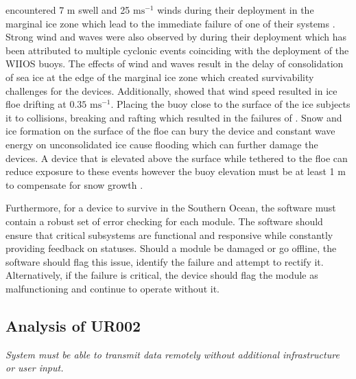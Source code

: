 \textcite{kohout2015device} encountered 7 m swell and 25 $\text{ms}^{-1}$ winds during their deployment in the marginal ice zone which lead to the immediate failure of one of their systems \cite{kohout2015device}. Strong wind and waves were also observed by \textcite{vichi2019effects,alberello2019drift} during their deployment which has been attributed to multiple cyclonic events coinciding with the deployment of the WIIOS buoys. The effects of wind and waves result in the delay of consolidation of sea ice at the edge of the marginal ice zone  which created survivability challenges for the devices. Additionally, \textcite{albarello2020drift} showed that wind speed resulted in ice floe drifting at $0.35$ $\text{ms}^{-1}$. Placing the buoy close to the surface of the ice subjects it to collisions, breaking and rafting which resulted in the failures of \cite{doble2017robust,rabault2019open}. Snow and ice formation on the surface of the floe can bury the device \cite{doble2017robust}  and constant wave energy on unconsolidated ice cause flooding which can further damage the devices. A device that is elevated above the surface while tethered to the floe can reduce exposure to these events however the buoy elevation must be at least 1 m to compensate for snow growth \cite{barber2005microwave}. \par

Furthermore, for a device to survive in the Southern Ocean, the software must contain a robust set of error checking for each module. The software should ensure that critical subsystems are functional and responsive while constantly providing feedback on statuses. Should a module be damaged or go offline, the software should flag this issue, identify the failure and attempt to rectify it. Alternatively, if the failure is critical, the device should flag the module as malfunctioning and continue to operate without it.

\subsection{Analysis of UR002}
\textit{System must be able to transmit data remotely without additional infrastructure or user input.}

